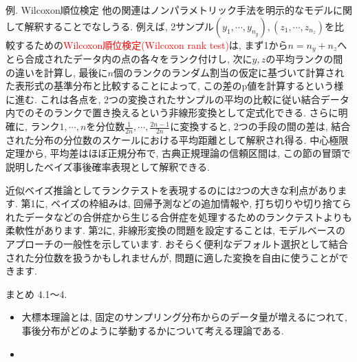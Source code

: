 \documentclass[10pt,dvipdfmx,a4]{beamer}
\newcommand{\tcr}[1]{\textcolor{red}{#1}}
\begin{document}

\begin{frame}{例. Wilcoxon順位検定}
他の関連はノンパラメトリック手法を明示的なモデルに関して解釈することでなしうる.
例えば, 2サンプル$(y_1,\cdots,y_{n_y}), (z_1,\cdots,z_{n_z})$を比較するための\tcr{Wilcoxon順位検定(Wilcoxon rank test)}は, まず1から$n=n_y+n_z$へとら合成されたデータ内の点の各々をランク付けし, 次に$y, z$の平均ランクの間の違いを計算し, 最後に$n$個のランクのランダム割当の仮定に基づいて計算された表形式の基準分布と比較することによって, この差のp値を計算するという様に進む.
これは各点を, 2つの変換されたサンプルの平均の比較に従い結合データ内でのそのランクで置き換えるという非線形変換として定式化できる.
さらに明確に, ランク$1, \cdots, n$を分位数$\tfrac{1}{2n},\cdots,\tfrac{2n-1}{2n}$に変換すると, 2つの手段の間の差は, 結合された分布の分位数のスケールにおける平均距離として解釈され得る.
中心極限定理から, 平均差はほぼ正規分布で, 古典正規理論の信頼区間は, この節の冒頭で説明したベイズ事後確率表現として解釈できる.
\end{frame}


\begin{frame}
近似ベイズ推論としてランクテストを表現するのには2つの大きな利点があります.
第1に, ベイズの枠組みは, 回帰予測などの追加情報や, 打ち切りや切り捨てられたデータなどの合併症から生じる合併症を処理するためのランクテストよりも柔軟性があります.
第2に, 非線形変換の問題を設定することは, モデルベースのアプローチの一般性を示しています.
おそらく便利なデフォルト選択として結合された分位数を扱うかもしれませんが, 問題に適した変換を自由に使うことができます.
\end{frame}


\begin{frame}{まとめ 4.1～4.}
\begin{itemize}
\item 大標本理論とは, 固定のサンプリング分布からのデータ量が増えるにつれて, 事後分布がどのように挙動するかについて考える理論である.
\item
\end{itemize}
\end{frame}

\end{document}
